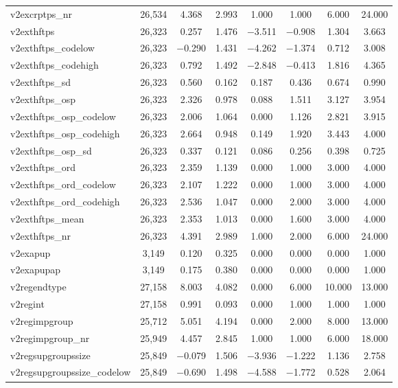 \begin{table}[!htbp]
\begin{tabular}{@{\extracolsep{5pt}}lccccccc}
v2excrptps\_nr & 26,534 & 4.368 & 2.993 & 1.000 & 1.000 & 6.000 & 24.000 \\ 
v2exthftps & 26,323 & 0.257 & 1.476 & $-$3.511 & $-$0.908 & 1.304 & 3.663 \\ 
v2exthftps\_codelow & 26,323 & $-$0.290 & 1.431 & $-$4.262 & $-$1.374 & 0.712 & 3.008 \\ 
v2exthftps\_codehigh & 26,323 & 0.792 & 1.492 & $-$2.848 & $-$0.413 & 1.816 & 4.365 \\ 
v2exthftps\_sd & 26,323 & 0.560 & 0.162 & 0.187 & 0.436 & 0.674 & 0.990 \\ 
v2exthftps\_osp & 26,323 & 2.326 & 0.978 & 0.088 & 1.511 & 3.127 & 3.954 \\ 
v2exthftps\_osp\_codelow & 26,323 & 2.006 & 1.064 & 0.000 & 1.126 & 2.821 & 3.915 \\ 
v2exthftps\_osp\_codehigh & 26,323 & 2.664 & 0.948 & 0.149 & 1.920 & 3.443 & 4.000 \\ 
v2exthftps\_osp\_sd & 26,323 & 0.337 & 0.121 & 0.086 & 0.256 & 0.398 & 0.725 \\ 
v2exthftps\_ord & 26,323 & 2.359 & 1.139 & 0.000 & 1.000 & 3.000 & 4.000 \\ 
v2exthftps\_ord\_codelow & 26,323 & 2.107 & 1.222 & 0.000 & 1.000 & 3.000 & 4.000 \\ 
v2exthftps\_ord\_codehigh & 26,323 & 2.536 & 1.047 & 0.000 & 2.000 & 3.000 & 4.000 \\ 
v2exthftps\_mean & 26,323 & 2.353 & 1.013 & 0.000 & 1.600 & 3.000 & 4.000 \\ 
v2exthftps\_nr & 26,323 & 4.391 & 2.989 & 1.000 & 2.000 & 6.000 & 24.000 \\ 
v2exapup & 3,149 & 0.120 & 0.325 & 0.000 & 0.000 & 0.000 & 1.000 \\ 
v2exapupap & 3,149 & 0.175 & 0.380 & 0.000 & 0.000 & 0.000 & 1.000 \\ 
v2regendtype & 27,158 & 8.003 & 4.082 & 0.000 & 6.000 & 10.000 & 13.000 \\ 
v2regint & 27,158 & 0.991 & 0.093 & 0.000 & 1.000 & 1.000 & 1.000 \\ 
v2regimpgroup & 25,712 & 5.051 & 4.194 & 0.000 & 2.000 & 8.000 & 13.000 \\ 
v2regimpgroup\_nr & 25,949 & 4.457 & 2.845 & 1.000 & 1.000 & 6.000 & 18.000 \\ 
v2regsupgroupssize & 25,849 & $-$0.079 & 1.506 & $-$3.936 & $-$1.222 & 1.136 & 2.758 \\ 
v2regsupgroupssize\_codelow & 25,849 & $-$0.690 & 1.498 & $-$4.588 & $-$1.772 & 0.528 & 2.064 \\ 

\end{tabular}
\end{table}
